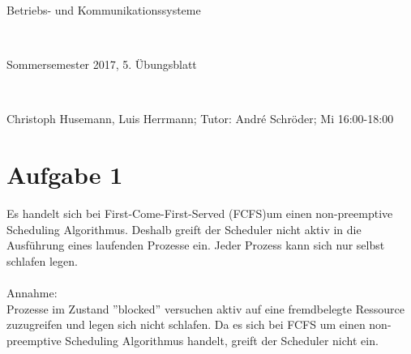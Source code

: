 \documentclass[numbers=noendperiod]{scrartcl}
\begin{document}
	
	\newcommand{\inputmintedframed}[2]{
		\begin{mdframed}[linecolor=bg,backgroundcolor=bg]
			\inputminted[mathescape,breaklines,linenos,numbersep=5pt,tabsize=3]{#1}{#2}
	\end{mdframed}}
	
	\hrulefill
	\begin{center}
		\bfseries %
		\sffamily %
		\begin{huge}
			Betriebs- und Kommunikationssysteme
		\end{huge}\\
		\begin{Large}
			Sommersemester 2017, 5. Übungsblatt
		\end{Large}\\
		\begin{small}
			Christoph Husemann, Luis Herrmann; Tutor: André Schröder; Mi 16:00-18:00
		\end{small}
		
		\vspace{-10pt}
	\end{center}
	\hrulefill
	
\section*{Aufgabe 1}
Es handelt sich bei First-Come-First-Served (FCFS)um einen non-preemptive Scheduling Algorithmus. Deshalb greift der Scheduler nicht aktiv in die Ausführung eines laufenden Prozesse ein. Jeder Prozess kann sich nur selbst schlafen legen.\\\\
Annahme:\\
Prozesse im Zustand ''blocked'' versuchen aktiv auf eine fremdbelegte Ressource zuzugreifen und legen sich nicht schlafen. Da es sich bei FCFS um einen non-preemptive Scheduling Algorithmus handelt, greift der Scheduler nicht ein.  \\
\end{document}
